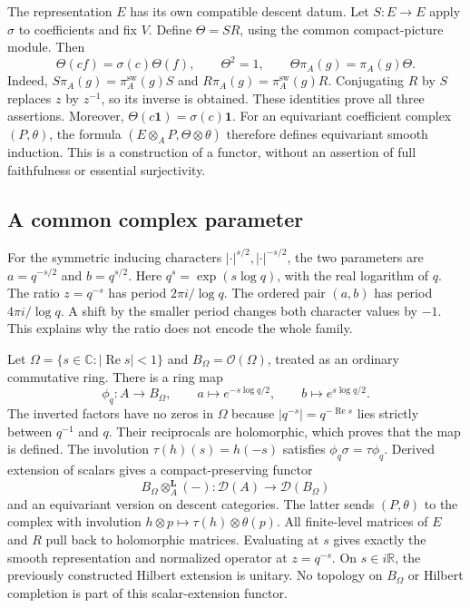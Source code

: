 The representation $E$ has its own compatible descent datum.
Let $S:E\to E$ apply $\sigma$ to coefficients and fix $V$.
Define $\Theta=SR$, using the common compact-picture module.
Then
\[
 \Theta(c f)=\sigma(c)\Theta(f),\qquad
 \Theta^2=1,\qquad \Theta\pi_A(g)=\pi_A(g)\Theta.
\]
Indeed, $S\pi_A(g)=\pi_A^{\mathrm{sw}}(g)S$ and
$R\pi_A(g)=\pi_A^{\mathrm{sw}}(g)R$.
Conjugating $R$ by $S$ replaces $z$ by $z^{-1}$, so its inverse is obtained.
These identities prove all three assertions.
Moreover, $\Theta(c\mathbf1)=\sigma(c)\mathbf1$.
For an equivariant coefficient complex $(P,\theta)$, the formula
$(E\otimes_A P,\Theta\otimes\theta)$ therefore defines equivariant smooth induction.
This is a construction of a functor, without an assertion of full faithfulness or essential surjectivity.

\subsection{A common complex parameter}

For the symmetric inducing characters $|\cdot|^{s/2},|\cdot|^{-s/2}$,
the two parameters are $a=q^{-s/2}$ and $b=q^{s/2}$.
Here $q^s=\exp(s\log q)$, with the real logarithm of $q$.
The ratio $z=q^{-s}$ has period $2\pi i/\log q$.
The ordered pair $(a,b)$ has period $4\pi i/\log q$.
A shift by the smaller period changes both character values by $-1$.
This explains why the ratio does not encode the whole family.

Let $\Omega=\{s\in\mathbb C:|\operatorname{Re}s|<1\}$ and
$B_\Omega=\mathcal O(\Omega)$, treated as an ordinary commutative ring.
There is a ring map
\[
 \phi_q:A\longrightarrow B_\Omega,\qquad
 a\longmapsto e^{-s\log q/2},\qquad b\longmapsto e^{s\log q/2}.
\]
The inverted factors have no zeros in $\Omega$ because
$|q^{-s}|=q^{-\operatorname{Re}s}$ lies strictly between $q^{-1}$ and $q$.
Their reciprocals are holomorphic, which proves that the map is defined.
The involution $\tau(h)(s)=h(-s)$ satisfies $\phi_q\sigma=\tau\phi_q$.
Derived extension of scalars gives a compact-preserving functor
\[
 B_\Omega\otimes_A^{\mathbf L}(-):\mathcal D(A)\longrightarrow\mathcal D(B_\Omega)
\]
and an equivariant version on descent categories.
The latter sends $(P,\theta)$ to the complex with involution
$h\otimes p\mapsto\tau(h)\otimes\theta(p)$.
All finite-level matrices of $E$ and $R$ pull back to holomorphic matrices.
Evaluating at $s$ gives exactly the smooth representation and normalized
operator at $z=q^{-s}$.
On $s\in i\mathbb R$, the previously constructed Hilbert extension is unitary.
No topology on $B_\Omega$ or Hilbert completion is part of this scalar-extension functor.


